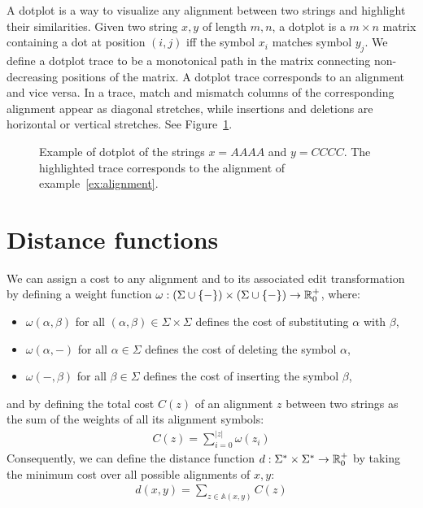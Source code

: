 A dotplot is a way to visualize any alignment between two strings and highlight their similarities.
Given two string $x,y$ of length $m,n$, a dotplot is a $m \times n$ matrix containing a dot at position $(i,j)$ iff the symbol $x_i$ matches symbol $y_j$.
We define a dotplot trace to be a monotonical path in the matrix connecting non-decreasing positions of the matrix.
A dotplot trace corresponds to an alignment and vice versa.
In a trace, match and mismatch columns of the corresponding alignment appear as diagonal stretches, while insertions and deletions are horizontal or vertical stretches.
See Figure~\ref{fig:dotplot}.

\begin{figure}[h]
\begin{center}
\caption[Example of dotplot]{Example of dotplot of the strings $x=AAAA$ and $y=CCCC$. The highlighted trace corresponds to the alignment of example~\ref{ex:alignment}.}
\label{fig:dotplot}

\end{center}
\end{figure}

\section{Distance functions}

We can assign a cost to any alignment and to its associated edit transformation by defining a weight function $\omega : (\Sigma \cup \{ - \}) \times (\Sigma \cup \{ - \}) \rightarrow \mathbb {R}_0^{+}$, where:
\begin{itemize}
\item $\omega(\alpha,\beta)$ for all $(\alpha,\beta) \in \Sigma \times \Sigma$ defines the cost of substituting $\alpha$ with $\beta$,
\item $\omega(\alpha,-)$ for all $\alpha \in \Sigma$ defines the cost of deleting the symbol $\alpha$,
\item $\omega(-,\beta)$ for all $\beta \in \Sigma$ defines the cost of inserting the symbol $\beta$,
\end{itemize}
and by defining the total cost $C(z)$ of an alignment $z$ between two strings as the sum of the weights of all its alignment symbols:
\begin{eqnarray}
C(z) = \sum_{i=0}^{|z|}{\omega(z_i)}
\end{eqnarray}
Consequently, we can define the distance function $d : \Sigma^{*} \times \Sigma^{*} \rightarrow \mathbb {R}_0^{+}$ by taking the minimum cost over all possible alignments of $x,y$:
\begin{eqnarray}
d(x,y) = \sum_{z \in \mathbb{A}(x,y)}{C(z)}
\end{eqnarray}

